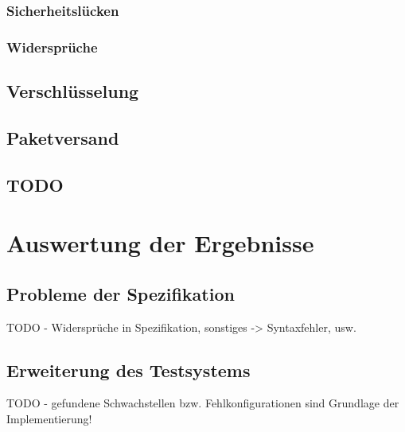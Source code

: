 \subsubsection{Sicherheitslücken}
\subsubsection{Widersprüche}
\subsubsection{}

\subsection{Verschlüsselung}
\subsection{Paketversand}
\subsection{TODO}

\section{Auswertung der Ergebnisse}
\subsection{Probleme der Spezifikation}
TODO - Widersprüche in Spezifikation, sonstiges -> Syntaxfehler, usw.

\subsection{Erweiterung des Testsystems}
TODO - gefundene Schwachstellen bzw. Fehlkonfigurationen sind Grundlage der Implementierung!